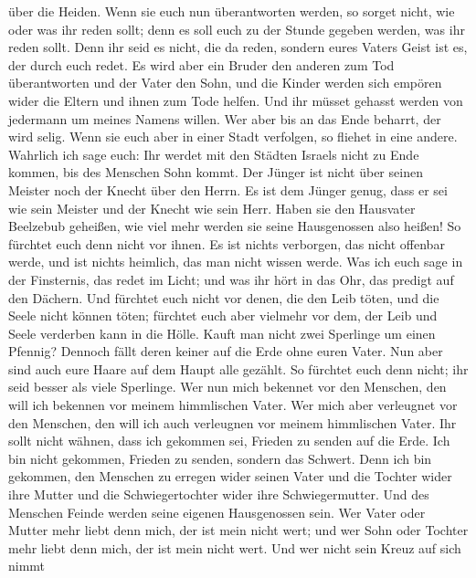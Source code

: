 über die Heiden.  Wenn sie euch nun überantworten werden,
so sorget nicht, wie oder was ihr reden sollt; denn es soll euch zu der
Stunde gegeben werden, was ihr reden sollt.  Denn ihr seid
es nicht, die da reden, sondern eures Vaters Geist ist es, der durch
euch redet.  Es wird aber ein Bruder den anderen zum Tod
überantworten und der Vater den Sohn, und die Kinder werden sich empören
wider die Eltern und ihnen zum Tode helfen.  Und ihr müsset
gehasst werden von jedermann um meines Namens willen. Wer aber bis an
das Ende beharrt, der wird selig.  Wenn sie euch aber in
einer Stadt verfolgen, so fliehet in eine andere. Wahrlich ich sage
euch: Ihr werdet mit den Städten Israels nicht zu Ende kommen, bis des
Menschen Sohn kommt.  Der Jünger ist nicht über seinen
Meister noch der Knecht über den Herrn.  Es ist dem Jünger
genug, dass er sei wie sein Meister und der Knecht wie sein Herr. Haben
sie den Hausvater Beelzebub geheißen, wie viel mehr werden sie seine
Hausgenossen also heißen!  So fürchtet euch denn nicht vor
ihnen. Es ist nichts verborgen, das nicht offenbar werde, und ist nichts
heimlich, das man nicht wissen werde.  Was ich euch sage in
der Finsternis, das redet im Licht; und was ihr hört in das Ohr, das
predigt auf den Dächern.  Und fürchtet euch nicht vor
denen, die den Leib töten, und die Seele nicht können töten; fürchtet
euch aber vielmehr vor dem, der Leib und Seele verderben kann in die
Hölle.  Kauft man nicht zwei Sperlinge um einen Pfennig?
Dennoch fällt deren keiner auf die Erde ohne euren Vater. 
Nun aber sind auch eure Haare auf dem Haupt alle gezählt. 
So fürchtet euch denn nicht; ihr seid besser als viele Sperlinge.
 Wer nun mich bekennet vor den Menschen, den will ich
bekennen vor meinem himmlischen Vater.  Wer mich aber
verleugnet vor den Menschen, den will ich auch verleugnen vor meinem
himmlischen Vater.  Ihr sollt nicht wähnen, dass ich
gekommen sei, Frieden zu senden auf die Erde. Ich bin nicht gekommen,
Frieden zu senden, sondern das Schwert.  Denn ich bin
gekommen, den Menschen zu erregen wider seinen Vater und die Tochter
wider ihre Mutter und die Schwiegertochter wider ihre Schwiegermutter.
 Und des Menschen Feinde werden seine eigenen Hausgenossen
sein.  Wer Vater oder Mutter mehr liebt denn mich, der ist
mein nicht wert; und wer Sohn oder Tochter mehr liebt denn mich, der ist
mein nicht wert.  Und wer nicht sein Kreuz auf sich nimmt
